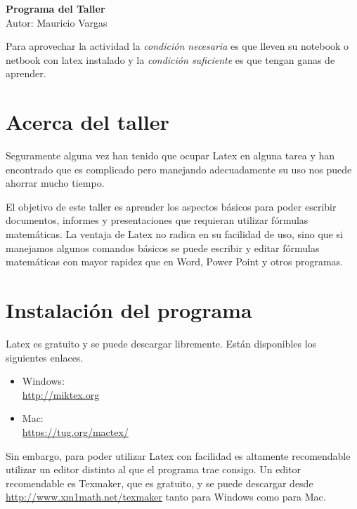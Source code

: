 \documentclass[oneside,spanish]{article}
\theoremstyle{definition}
\theoremstyle{definition}\newtheorem{definicion}{Definición}
\theoremstyle{definition}\newtheorem{ejemplo}{Ejemplo}
\theoremstyle{remark}\newtheorem{nota}{\textsc{Nota}}
\theoremstyle{definition}\newtheorem{proposicion}{Proposición}
\theoremstyle{definition}\newtheorem{problema}{Problema}
\begin{document}
\thispagestyle{fancy}

\begin{center}
\Large{\textbf{\color{RoyalBlue}Programa del Taller}}
\\\normalsize Autor: Mauricio Vargas
\end{center}

\bigskip

Para aprovechar la actividad la \emph{condición necesaria} es que lleven su notebook o netbook con latex instalado y la  \emph{condición suficiente} es que tengan ganas de aprender.   

\section{Acerca del taller}
Seguramente alguna vez han tenido que ocupar Latex en alguna tarea y han encontrado que es complicado pero manejando adecuadamente su uso nos puede ahorrar mucho tiempo. 

\smallskip

El objetivo de este taller es aprender los aspectos básicos para poder escribir documentos, informes y presentaciones que requieran utilizar fórmulas matemáticas. La ventaja de Latex no radica en su facilidad de uso, sino que si manejamos algunos comandos b\'asicos se puede escribir y editar f\'ormulas matem\'aticas con mayor rapidez que en Word, Power Point y otros programas. 

\smallskip

\section{Instalaci\'on del programa}

Latex es gratuito y se puede descargar libremente. Est\'an disponibles los siguientes enlaces.

\begin{itemize}
\item Windows: 
\\ \url{http://miktex.org}

\item Mac:
\\ \url{https://tug.org/mactex/}
\end{itemize}

\smallskip

Sin embargo, para poder utilizar Latex con facilidad es altamente recomendable utilizar un editor distinto al que el programa trae consigo. Un editor recomendable es Texmaker, que es gratuito, y se puede descargar desde \url{http://www.xm1math.net/texmaker} tanto para Windows como para Mac.
\end{document}
